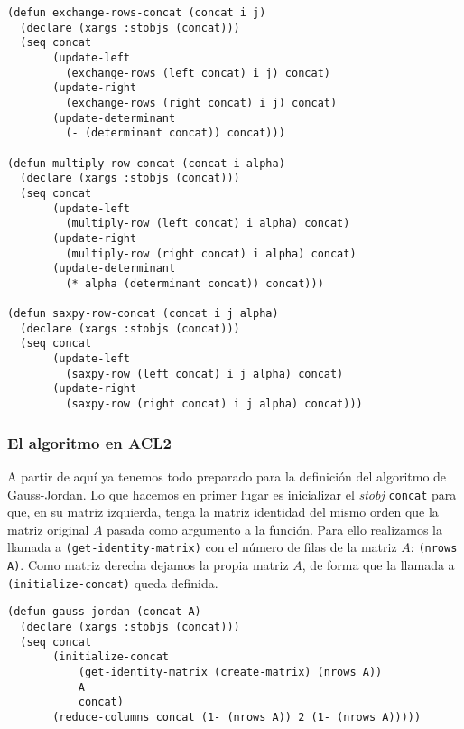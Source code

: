 \documentclass[a4paper,10pt]{article}
\begin{document}
\begin{lstlisting}[language=clips]
(defun exchange-rows-concat (concat i j)
  (declare (xargs :stobjs (concat)))
  (seq concat
       (update-left 
         (exchange-rows (left concat) i j) concat) 
       (update-right 
         (exchange-rows (right concat) i j) concat)    
       (update-determinant 
         (- (determinant concat)) concat)))  
			
(defun multiply-row-concat (concat i alpha)
  (declare (xargs :stobjs (concat)))
  (seq concat
       (update-left 
         (multiply-row (left concat) i alpha) concat)
       (update-right 
         (multiply-row (right concat) i alpha) concat)
       (update-determinant 
         (* alpha (determinant concat)) concat)))

(defun saxpy-row-concat (concat i j alpha)
  (declare (xargs :stobjs (concat)))
  (seq concat
       (update-left 
         (saxpy-row (left concat) i j alpha) concat)
       (update-right 
         (saxpy-row (right concat) i j alpha) concat)))
\end{lstlisting}

\vspace{12pt}
\subsubsection{El algoritmo en ACL2}
\vspace{10pt}

A partir de aquí ya tenemos todo preparado para la definición del algoritmo de Gauss-Jordan. Lo que hacemos en primer lugar es inicializar el \emph{stobj} \texttt{concat} para que, en su matriz izquierda, tenga la matriz identidad del mismo orden que la matriz original $A$ pasada como argumento a la función. Para ello realizamos la llamada a \texttt{(get-identity-matrix)} con el número de filas de la matriz $A$: \texttt{(nrows A)}. Como matriz derecha dejamos la propia matriz $A$, de forma que la llamada a \texttt{(initialize-concat)} queda definida.

\par \vspace{10pt}

\begin{lstlisting}[language=clips]
(defun gauss-jordan (concat A)
  (declare (xargs :stobjs (concat)))
  (seq concat
       (initialize-concat 
           (get-identity-matrix (create-matrix) (nrows A)) 
           A 
           concat)
       (reduce-columns concat (1- (nrows A)) 2 (1- (nrows A)))))
\end{lstlisting}
\end{document}
